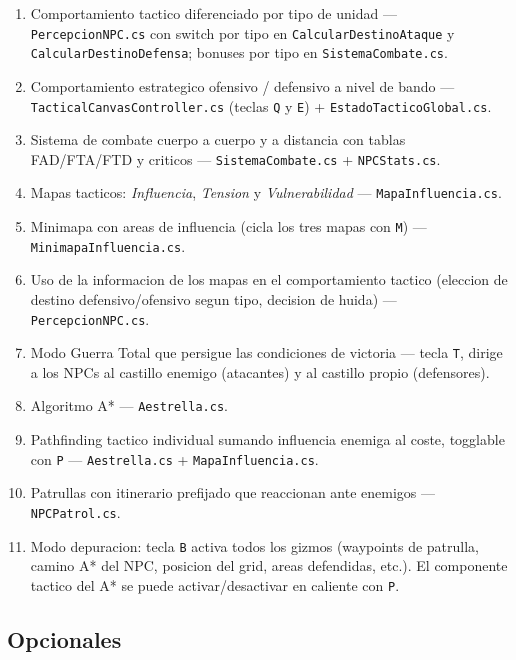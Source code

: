 \documentclass[12pt,a4paper]{article}
\begin{document}
\begin{enumerate}[label=(\alph*),leftmargin=1.5em]
    \item Comportamiento tactico diferenciado por tipo de unidad — \texttt{PercepcionNPC.cs} con switch por tipo en \texttt{CalcularDestinoAtaque} y \texttt{CalcularDestinoDefensa}; bonuses por tipo en \texttt{SistemaCombate.cs}.
    \item Comportamiento estrategico ofensivo / defensivo a nivel de bando — \texttt{TacticalCanvasController.cs} (teclas \texttt{Q} y \texttt{E}) + \texttt{EstadoTacticoGlobal.cs}.
    \item Sistema de combate cuerpo a cuerpo y a distancia con tablas FAD/FTA/FTD y criticos — \texttt{SistemaCombate.cs} + \texttt{NPCStats.cs}.
    \item Mapas tacticos: \emph{Influencia}, \emph{Tension} y \emph{Vulnerabilidad} — \texttt{MapaInfluencia.cs}.
    \item Minimapa con areas de influencia (cicla los tres mapas con \texttt{M}) — \texttt{MinimapaInfluencia.cs}.
    \item Uso de la informacion de los mapas en el comportamiento tactico (eleccion de destino defensivo/ofensivo segun tipo, decision de huida) — \texttt{PercepcionNPC.cs}.
    \item Modo Guerra Total que persigue las condiciones de victoria — tecla \texttt{T}, dirige a los NPCs al castillo enemigo (atacantes) y al castillo propio (defensores).
    \item Algoritmo A* — \texttt{Aestrella.cs}.
    \item Pathfinding tactico individual sumando influencia enemiga al coste, togglable con \texttt{P} — \texttt{Aestrella.cs} + \texttt{MapaInfluencia.cs}.
    \item Patrullas con itinerario prefijado que reaccionan ante enemigos — \texttt{NPCPatrol.cs}.
    \item Modo depuracion: tecla \texttt{B} activa todos los gizmos (waypoints de patrulla, camino A* del NPC, posicion del grid, areas defendidas, etc.). El componente tactico del A* se puede activar/desactivar en caliente con \texttt{P}.
\end{enumerate}

\subsection{Opcionales}
\end{document}
